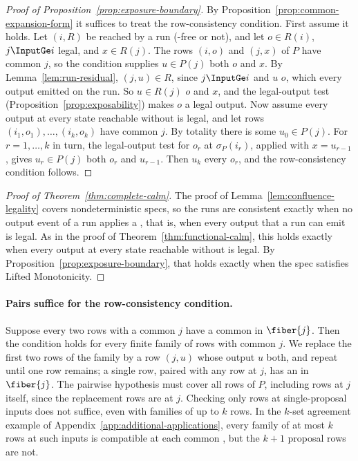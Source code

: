 \begin{proof}[Proof of Proposition~\ref{prop:exposure-boundary}]
By Proposition~\ref{prop:common-expansion-form} it suffices to treat the
row-consistency condition.  First assume it holds.  Let $(i,R)$ be reached by
a run (\commitment-free or not), and let $o\in R(i)$, $j\InputGe i$ legal, and
$x\in R(j)$.  The rows $(i,o)$ and $(j,x)$ of $P$ have common \indesc $j$, so
the condition supplies $u\in P(j)$ \outrelpart both $o$ and $x$.  By
Lemma~\ref{lem:run-residual}, $(j,u)\in R$, since $j\InputGe i$ and $u$
\outrel $o$, which \outrel every output emitted on the run.  So $u\in R(j)$
\outrel $o$ and $x$, and the legal-output test
(Proposition~\ref{prop:exposability}) makes $o$ a legal output.  Now assume
every output at every state reachable without \commitment is legal, and let
rows
$(i_1,o_1),\ldots,(i_k,o_k)$ have common \indesc $j$.  By totality there is some
$u_0\in P(j)$.  For $r=1,\ldots,k$ in turn, the legal-output test for $o_r$ at
$\sigma_P(i_r)$, applied with $x=u_{r-1}$, gives $u_r\in P(j)$ \outrelpart both
$o_r$ and $u_{r-1}$.  Then $u_k$ \outrel every $o_r$, and the
row-consistency condition follows.
\end{proof}

\begin{proof}[Proof of Theorem~\ref{thm:complete-calm}]
The proof of Lemma~\ref{lem:confluence-legality} covers nondeterministic specs,
so the runs are consistent exactly when no output event of a run applies a
\commitment, that is, when every output that a run can emit is legal.  As in
the proof of Theorem~\ref{thm:functional-calm}, this holds exactly when every output at every state reachable without \commitment is legal.  By
Proposition~\ref{prop:exposure-boundary}, that holds exactly when the spec
satisfies Lifted Monotonicity.
\end{proof}

\paragraph{Pairs suffice for the row-consistency condition.}
\label{app:pairs-suffice}
Suppose every two rows with a common \indesc $j$ have a common \outnoun in
$\fiber{j}$.  Then the condition holds for every finite family of rows with
common \indesc $j$.  We replace the first two rows of the family by a row
$(j,u)$ whose output $u$ \outrel both, and repeat until one row remains; a
single row, paired with any row at $j$, has an \outnoun in $\fiber{j}$.  The
pairwise hypothesis must cover all rows of $P$, including rows at $j$ itself,
since the replacement rows are at $j$.  Checking only rows at single-proposal
inputs does not suffice, even with families of up to $k$ rows.  In the
$k$-set agreement example of Appendix~\ref{app:additional-applications},
every family of at most $k$ rows at such inputs is compatible at each common
\indesc, but the $k+1$ proposal rows are not.

